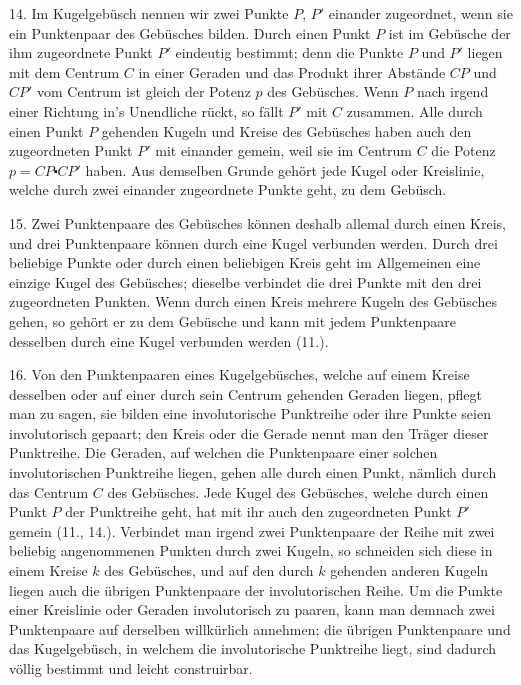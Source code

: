 14. Im Kugelgeb\"usch nennen wir zwei Punkte $P$, $P'$
{\glqq}einander zugeordnet{\grqq}, wenn sie ein Punktenpaar des Geb\"usches
bilden. Durch einen Punkt $P$ ist im Geb\"usche der
ihm zugeordnete Punkt $P'$ eindeutig bestimmt; denn die
Punkte $P$ und $P'$ liegen mit dem Centrum $C$ in einer Geraden
und das Produkt ihrer Abst\"ande $CP$ und $CP'$ vom
Centrum ist gleich der Potenz $p$ des Geb\"usches. Wenn $P$
nach irgend einer Richtung in's Unendliche r\"uckt, so f\"allt $P'$
mit $C$ zusammen. Alle durch einen Punkt $P$ gehenden Kugeln
und Kreise des Geb\"usches haben auch den zugeordneten
Punkt $P'$ mit einander gemein, weil sie im Centrum $C$ die
Potenz $p = CP \centerdot CP'$ haben. Aus demselben Grunde geh\"ort
jede Kugel oder Kreislinie, welche durch zwei einander zugeordnete
Punkte geht, zu dem Geb\"usch.

15. Zwei Punktenpaare des Geb\"usches k\"onnen deshalb
allemal durch einen Kreis, und drei Punktenpaare k\"onnen
durch eine Kugel verbunden werden. Durch drei beliebige
Punkte oder durch einen beliebigen Kreis geht im Allgemeinen
eine einzige Kugel des Geb\"usches; dieselbe verbindet
die drei Punkte mit den drei zugeordneten Punkten. Wenn
durch einen Kreis mehrere Kugeln des Geb\"usches gehen, so
geh\"ort er zu dem Geb\"usche und kann mit jedem Punktenpaare
desselben durch eine Kugel verbunden werden (11.).

16. Von den Punktenpaaren eines Kugelgeb\"usches,
welche auf einem Kreise desselben oder auf einer durch sein
Centrum gehenden Geraden liegen, pflegt man zu sagen, sie
bilden eine {\glqq}involutorische Punktreihe{\grqq} oder ihre Punkte
seien {\grqq}involutorisch gepaart{\grqq}; den Kreis oder die Gerade
nennt man den {\glqq}Tr\"ager{\grqq} dieser Punktreihe. Die Geraden,
auf welchen die Punktenpaare einer solchen involutorischen
Punktreihe liegen, gehen alle durch einen Punkt, n\"amlich
durch das Centrum $C$ des Geb\"usches. Jede Kugel des Geb\"usches,
welche durch einen Punkt $P$ der Punktreihe geht,
hat mit ihr auch den zugeordneten Punkt $P'$ gemein (11.,
14.). Verbindet man irgend zwei Punktenpaare der Reihe
mit zwei beliebig angenommenen Punkten durch zwei Kugeln,
so schneiden sich diese in einem Kreise $k$ des Geb\"usches,
und auf den durch $k$ gehenden anderen Kugeln liegen auch
die \"ubrigen Punktenpaare der involutorischen Reihe. Um die
Punkte einer Kreislinie oder Geraden involutorisch zu paaren,
kann man demnach zwei Punktenpaare auf derselben willk\"urlich
annehmen; die \"ubrigen Punktenpaare und das Kugelgeb\"usch,
in welchem die involutorische Punktreihe liegt, sind
dadurch v\"ollig bestimmt und leicht construirbar.


